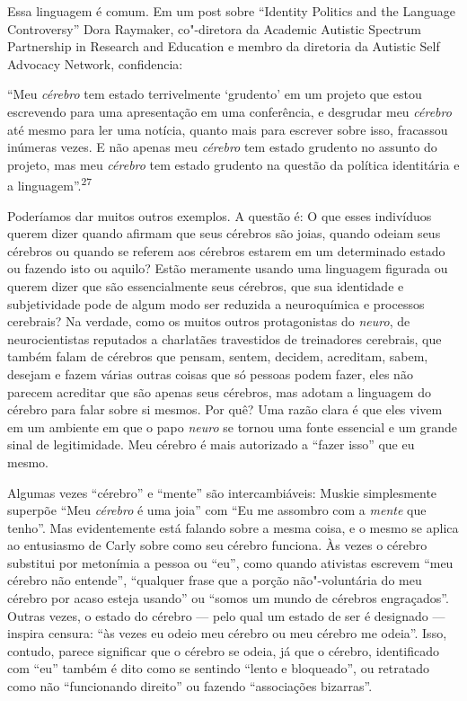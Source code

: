 Essa linguagem é comum. Em um post sobre ``Identity Politics and the
Language Controversy'' Dora Raymaker, co"-diretora da Academic Autistic
Spectrum Partnership in Research and Education e membro da diretoria da
Autistic Self Advocacy Network, confidencia:

``Meu \emph{cérebro} tem estado terrivelmente `grudento' em um projeto
que estou escrevendo para uma apresentação em uma conferência, e
desgrudar meu \emph{cérebro} até mesmo para ler uma notícia, quanto mais
para escrever sobre isso, fracassou inúmeras vezes. E não apenas meu
\emph{cérebro} tem estado grudento no assunto do projeto, mas meu
\emph{cérebro} tem estado grudento na questão da política identitária e
a linguagem''.\textsuperscript{27}

Poderíamos dar muitos outros exemplos. A questão é: O que esses
indivíduos querem dizer quando afirmam que seus cérebros são joias,
quando odeiam seus cérebros ou quando se referem aos cérebros estarem em
um determinado estado ou fazendo isto ou aquilo? Estão meramente usando
uma linguagem figurada ou querem dizer que são essencialmente seus
cérebros, que sua identidade e subjetividade pode de algum modo ser
reduzida a neuroquímica e processos cerebrais? Na verdade, como os
muitos outros protagonistas do \emph{neuro}, de neurocientistas
reputados a charlatães travestidos de treinadores cerebrais, que também
falam de cérebros que pensam, sentem, decidem, acreditam, sabem, desejam
e fazem várias outras coisas que só pessoas podem fazer, eles não
parecem acreditar que são apenas seus cérebros, mas adotam a linguagem
do cérebro para falar sobre si mesmos. Por quê? Uma razão clara é que
eles vivem em um ambiente em que o papo \emph{neuro} se tornou uma fonte
essencial e um grande sinal de legitimidade. Meu cérebro é mais
autorizado a ``fazer isso'' que eu mesmo.

Algumas vezes ``cérebro'' e ``mente'' são intercambiáveis: Muskie
simplesmente superpõe ``Meu \emph{cérebro} é uma joia'' com ``Eu me
assombro com a \emph{mente} que tenho''. Mas evidentemente está falando
sobre a mesma coisa, e o mesmo se aplica ao entusiasmo de Carly sobre
como seu cérebro funciona. Às vezes o cérebro substitui por metonímia a
pessoa ou ``eu'', como quando ativistas escrevem ``meu cérebro não
entende'', ``qualquer frase que a porção não"-voluntária do meu cérebro
por acaso esteja usando'' ou ``somos um mundo de cérebros engraçados''.
Outras vezes, o estado do cérebro --- pelo qual um estado de ser é
designado --- inspira censura: ``às vezes eu odeio meu cérebro ou meu
cérebro me odeia''. Isso, contudo, parece significar que o cérebro se
odeia, já que o cérebro, identificado com ``eu'' também é dito como se
sentindo ``lento e bloqueado'', ou retratado como não ``funcionando
direito'' ou fazendo ``associações bizarras''.

